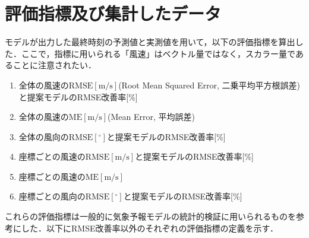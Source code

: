 \section{評価指標及び集計したデータ \label{section:exp-metrics}}
モデルが出力した最終時刻の予測値と実測値を用いて，以下の評価指標を算出した．ここで，指標に用いられる「風速」はベクトル量ではなく，スカラー量であることに注意されたい．
% 
\begin{enumerate}
  \item 全体の風速の$\mathrm{RMSE[m/s]}$(Root Mean Squared Error, 二乗平均平方根誤差)と提案モデルのRMSE改善率[\%]
  \item 全体の風速の$\mathrm{ME[m/s]}$(Mean Error, 平均誤差)
  \item 全体の風向の$\mathrm{RMSE[^\circ]}$と提案モデルのRMSE改善率[\%]
  \item 座標ごとの風速の$\mathrm{RMSE[m/s]}$と提案モデルのRMSE改善率[\%]
  \item 座標ごとの風速の$\mathrm{ME[m/s]}$
  \item 座標ごとの風向の$\mathrm{RMSE[^\circ]}$と提案モデルのRMSE改善率[\%]
\end{enumerate}
これらの評価指標は一般的に気象予報モデルの統計的検証に用いられるものを参考にした\cite{Kishochou2018}．以下にRMSE改善率以外のそれぞれの評価指標の定義を示す．

